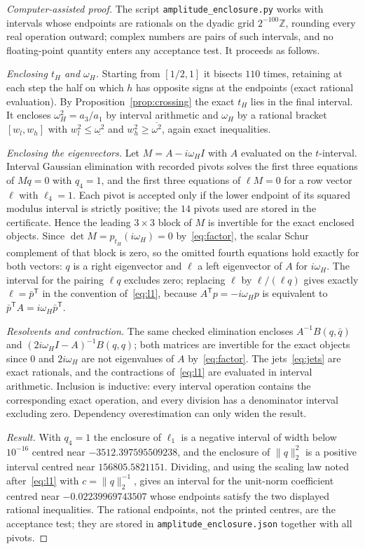 \documentclass[11pt,a4paper]{article}
\theoremstyle{plain}
\theoremstyle{definition}
\theoremstyle{remark}
\newcommand{\Z}{\mathbb{Z}}
\begin{document}
\begin{proof}[Computer-assisted proof]
The script \texttt{amplitude\_enclosure.py} works with intervals whose endpoints are rationals on the dyadic grid $2^{-100}\Z$, rounding every real operation outward; complex numbers are pairs of such intervals, and no floating-point quantity enters any acceptance test. It proceeds as follows.

\emph{Enclosing $t_H$ and $\omega_H$.} Starting from $[1/2,1]$ it bisects $110$ times, retaining at each step the half on which $h$ has opposite signs at the endpoints (exact rational evaluation). By Proposition~\ref{prop:crossing} the exact $t_H$ lies in the final interval. It encloses $\omega_H^2=a_3/a_1$ by interval arithmetic and $\omega_H$ by a rational bracket $[w_l,w_h]$ with $w_l^2\le\underline{\omega^2}$ and $w_h^2\ge\overline{\omega^2}$, again exact inequalities.

\emph{Enclosing the eigenvectors.} Let $M=A-i\omega_HI$ with $A$ evaluated on the $t$-interval. Interval Gaussian elimination with recorded pivots solves the first three equations of $Mq=0$ with $q_4=1$, and the first three equations of $\ell M=0$ for a row vector $\ell$ with $\ell_4=1$. Each pivot is accepted only if the lower endpoint of its squared modulus interval is strictly positive; the $14$ pivots used are stored in the certificate. Hence the leading $3\times3$ block of $M$ is invertible for the exact enclosed objects. Since $\det M=p_{t_H}(i\omega_H)=0$ by~\eqref{eq:factor}, the scalar Schur complement of that block is zero, so the omitted fourth equations hold exactly for both vectors: $q$ is a right eigenvector and $\ell$ a left eigenvector of $A$ for $i\omega_H$. The interval for the pairing $\ell q$ excludes zero; replacing $\ell$ by $\ell/(\ell q)$ gives exactly $\ell=\bar p^{\mathsf T}$ in the convention of~\eqref{eq:l1}, because $A^{\mathsf T}p=-i\omega_Hp$ is equivalent to $\bar p^{\mathsf T}A=i\omega_H\bar p^{\mathsf T}$.

\emph{Resolvents and contraction.} The same checked elimination encloses $A^{-1}B(q,\bar q)$ and $(2i\omega_HI-A)^{-1}B(q,q)$; both matrices are invertible for the exact objects since $0$ and $2i\omega_H$ are not eigenvalues of $A$ by~\eqref{eq:factor}. The jets~\eqref{eq:jets} are exact rationals, and the contractions of~\eqref{eq:l1} are evaluated in interval arithmetic. Inclusion is inductive: every interval operation contains the corresponding exact operation, and every division has a denominator interval excluding zero. Dependency overestimation can only widen the result.

\emph{Result.} With $q_4=1$ the enclosure of $\ell_1$ is a negative interval of width below $10^{-16}$ centred near $-3512.397595509238$, and the enclosure of $\|q\|_2^2$ is a positive interval centred near $156805.5821151$. Dividing, and using the scaling law noted after~\eqref{eq:l1} with $c=\|q\|_2^{-1}$, gives an interval for the unit-norm coefficient centred near $-0.02239969743507$ whose endpoints satisfy the two displayed rational inequalities. The rational endpoints, not the printed centres, are the acceptance test; they are stored in \texttt{amplitude\_enclosure.json} together with all pivots.
\end{proof}
\end{document}
